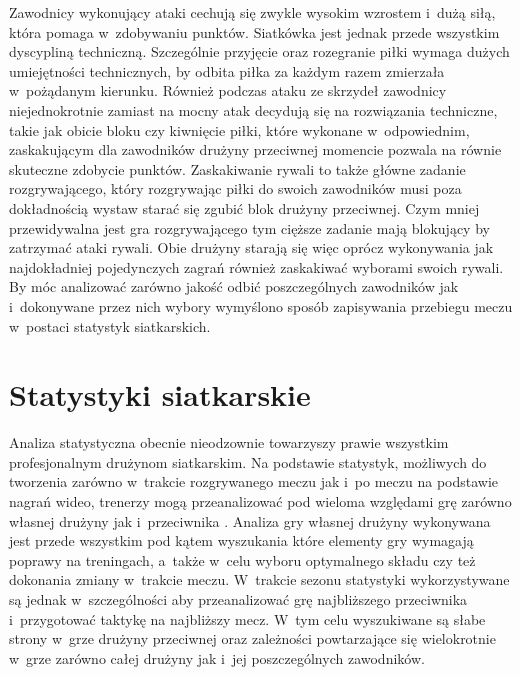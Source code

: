 \documentclass[a4paper,twoside,12pt]{book}
\begin{document}
Zawodnicy wykonujący ataki cechują się zwykle wysokim wzrostem i~dużą siłą, która pomaga w~zdobywaniu punktów. Siatkówka jest jednak przede wszystkim dyscypliną techniczną. Szczególnie przyjęcie oraz rozegranie piłki wymaga dużych umiejętności technicznych, by odbita piłka za każdym razem zmierzała w~pożądanym kierunku. Również podczas ataku ze skrzydeł zawodnicy niejednokrotnie zamiast na mocny atak decydują się na rozwiązania techniczne, takie jak obicie bloku czy kiwnięcie piłki, które wykonane w~odpowiednim, zaskakującym dla zawodników drużyny przeciwnej momencie pozwala na równie skuteczne zdobycie punktów. Zaskakiwanie rywali to także główne zadanie rozgrywającego, który rozgrywając piłki do swoich zawodników musi poza dokładnością wystaw starać się zgubić blok drużyny przeciwnej. Czym mniej przewidywalna jest gra rozgrywającego tym cięższe zadanie mają blokujący by zatrzymać ataki rywali. Obie drużyny starają się więc oprócz wykonywania jak najdokładniej pojedynczych zagrań również zaskakiwać wyborami swoich rywali. By móc analizować zarówno jakość odbić poszczególnych zawodników jak i~dokonywane przez nich wybory wymyślono sposób zapisywania przebiegu meczu w~postaci statystyk siatkarskich.

\section{Statystyki siatkarskie}
\label{roz:statystyki-siatkarskie}

Analiza statystyczna obecnie nieodzownie towarzyszy prawie wszystkim profesjonalnym drużynom siatkarskim. Na podstawie statystyk, możliwych do tworzenia zarówno w~trakcie rozgrywanego meczu jak i~po meczu na podstawie nagrań wideo, trenerzy mogą przeanalizować pod wieloma względami grę zarówno własnej drużyny jak i~przeciwnika \cite{bib:volleyballStats}. Analiza gry własnej drużyny wykonywana jest przede wszystkim pod kątem wyszukania które elementy gry wymagają poprawy na treningach, a~także w~celu wyboru optymalnego składu czy też dokonania zmiany w~trakcie meczu. W~trakcie sezonu statystyki wykorzystywane są jednak w~szczególności aby przeanalizować grę najbliższego przeciwnika i~przygotować taktykę na najbliższy mecz. W~tym celu wyszukiwane są słabe
strony w~grze drużyny przeciwnej oraz zależności powtarzające się wielokrotnie w~grze zarówno całej drużyny jak i~jej poszczególnych zawodników.
\end{document}
